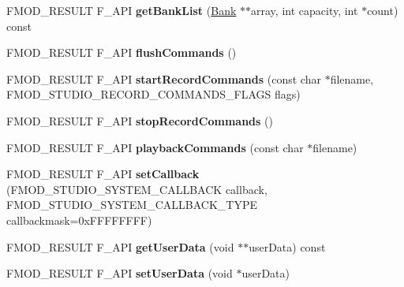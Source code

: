 \begin{DoxyCompactItemize}
\item 
\hypertarget{class_f_m_o_d_1_1_studio_1_1_system_a4f5904ba685b59ac1b8e73f73009467e}{F\+M\+O\+D\+\_\+\+R\+E\+S\+U\+L\+T F\+\_\+\+A\+P\+I {\bfseries get\+Bank\+List} (\hyperlink{class_f_m_o_d_1_1_studio_1_1_bank}{Bank} $\ast$$\ast$array, int capacity, int $\ast$count) const }\label{class_f_m_o_d_1_1_studio_1_1_system_a4f5904ba685b59ac1b8e73f73009467e}

\item 
\hypertarget{class_f_m_o_d_1_1_studio_1_1_system_abf1fb5ba97f62cbf857887eb5a2d580b}{F\+M\+O\+D\+\_\+\+R\+E\+S\+U\+L\+T F\+\_\+\+A\+P\+I {\bfseries flush\+Commands} ()}\label{class_f_m_o_d_1_1_studio_1_1_system_abf1fb5ba97f62cbf857887eb5a2d580b}

\item 
\hypertarget{class_f_m_o_d_1_1_studio_1_1_system_a314de1f6d7de380d38a0c289be42c4f0}{F\+M\+O\+D\+\_\+\+R\+E\+S\+U\+L\+T F\+\_\+\+A\+P\+I {\bfseries start\+Record\+Commands} (const char $\ast$filename, F\+M\+O\+D\+\_\+\+S\+T\+U\+D\+I\+O\+\_\+\+R\+E\+C\+O\+R\+D\+\_\+\+C\+O\+M\+M\+A\+N\+D\+S\+\_\+\+F\+L\+A\+G\+S flags)}\label{class_f_m_o_d_1_1_studio_1_1_system_a314de1f6d7de380d38a0c289be42c4f0}

\item 
\hypertarget{class_f_m_o_d_1_1_studio_1_1_system_aa2ed17c5ac75b9f72cf12adcee4d2f93}{F\+M\+O\+D\+\_\+\+R\+E\+S\+U\+L\+T F\+\_\+\+A\+P\+I {\bfseries stop\+Record\+Commands} ()}\label{class_f_m_o_d_1_1_studio_1_1_system_aa2ed17c5ac75b9f72cf12adcee4d2f93}

\item 
\hypertarget{class_f_m_o_d_1_1_studio_1_1_system_a3b85e5247e581518de2b0142af2e851d}{F\+M\+O\+D\+\_\+\+R\+E\+S\+U\+L\+T F\+\_\+\+A\+P\+I {\bfseries playback\+Commands} (const char $\ast$filename)}\label{class_f_m_o_d_1_1_studio_1_1_system_a3b85e5247e581518de2b0142af2e851d}

\item 
\hypertarget{class_f_m_o_d_1_1_studio_1_1_system_ae9c9b6702682c98e0634fd650146009d}{F\+M\+O\+D\+\_\+\+R\+E\+S\+U\+L\+T F\+\_\+\+A\+P\+I {\bfseries set\+Callback} (F\+M\+O\+D\+\_\+\+S\+T\+U\+D\+I\+O\+\_\+\+S\+Y\+S\+T\+E\+M\+\_\+\+C\+A\+L\+L\+B\+A\+C\+K callback, F\+M\+O\+D\+\_\+\+S\+T\+U\+D\+I\+O\+\_\+\+S\+Y\+S\+T\+E\+M\+\_\+\+C\+A\+L\+L\+B\+A\+C\+K\+\_\+\+T\+Y\+P\+E callbackmask=0x\+F\+F\+F\+F\+F\+F\+F\+F)}\label{class_f_m_o_d_1_1_studio_1_1_system_ae9c9b6702682c98e0634fd650146009d}

\item 
\hypertarget{class_f_m_o_d_1_1_studio_1_1_system_aafd4a9efb1925ea7e813ae19b062cf63}{F\+M\+O\+D\+\_\+\+R\+E\+S\+U\+L\+T F\+\_\+\+A\+P\+I {\bfseries get\+User\+Data} (void $\ast$$\ast$user\+Data) const }\label{class_f_m_o_d_1_1_studio_1_1_system_aafd4a9efb1925ea7e813ae19b062cf63}

\item 
\hypertarget{class_f_m_o_d_1_1_studio_1_1_system_a8afb4647f653bd1cd2b1c644caae7caa}{F\+M\+O\+D\+\_\+\+R\+E\+S\+U\+L\+T F\+\_\+\+A\+P\+I {\bfseries set\+User\+Data} (void $\ast$user\+Data)}\label{class_f_m_o_d_1_1_studio_1_1_system_a8afb4647f653bd1cd2b1c644caae7caa}

\end{DoxyCompactItemize}
